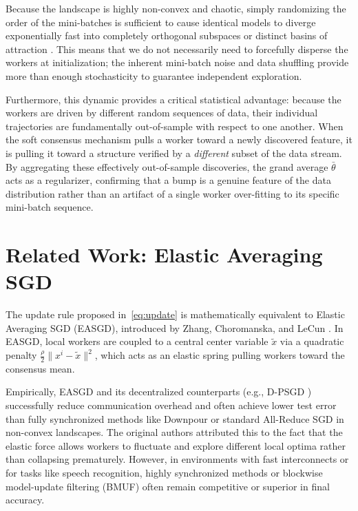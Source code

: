 \documentclass{article}
\begin{document}
Because the landscape is highly non-convex and chaotic, simply randomizing the order of the mini-batches is sufficient to cause identical models to diverge exponentially fast into completely orthogonal subspaces or distinct basins of attraction \cite{fort2019deep}. This means that we do not necessarily need to forcefully disperse the workers at initialization; the inherent mini-batch noise and data shuffling provide more than enough stochasticity to guarantee independent exploration.

Furthermore, this dynamic provides a critical statistical advantage: because the workers are driven by different random sequences of data, their individual trajectories are fundamentally out-of-sample with respect to one another. When the soft consensus mechanism pulls a worker toward a newly discovered feature, it is pulling it toward a structure verified by a \emph{different} subset of the data stream. By aggregating these effectively out-of-sample discoveries, the grand average $\bar{\theta}$ acts as a regularizer, confirming that a bump is a genuine feature of the data distribution rather than an artifact of a single worker over-fitting to its specific mini-batch sequence.

\section{Related Work: Elastic Averaging SGD}

The update rule proposed in~\eqref{eq:update} is mathematically equivalent to
Elastic Averaging SGD (EASGD), introduced by Zhang, Choromanska, and LeCun \cite{zhang2015deep}. In EASGD, local workers are coupled to a central center variable $\tilde{x}$ via a quadratic penalty $\frac{\rho}{2}\|x^i - \tilde{x}\|^2$, which acts as an elastic spring pulling workers toward the consensus mean.

Empirically, EASGD and its decentralized counterparts (e.g., D-PSGD \cite{lian2017can}) successfully reduce communication overhead and often achieve lower test error than fully synchronized methods like Downpour or standard All-Reduce SGD in non-convex landscapes. The original authors attributed this to the fact that the elastic force allows workers to fluctuate and explore different local optima rather than collapsing prematurely. However, in environments with fast interconnects or for tasks like speech recognition, highly synchronized methods or blockwise model-update filtering (BMUF) \cite{chen2016scalable} often remain competitive or superior in final accuracy.
\end{document}
